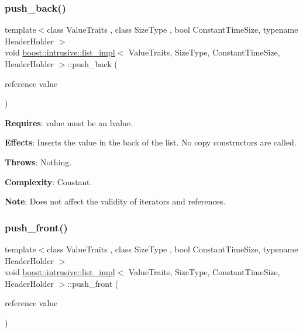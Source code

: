 \subsubsection{\texorpdfstring{push\+\_\+back()}{push\_back()}}
{\footnotesize\ttfamily template$<$class Value\+Traits , class Size\+Type , bool Constant\+Time\+Size, typename Header\+Holder $>$ \\
void \hyperlink{classboost_1_1intrusive_1_1list__impl}{boost\+::intrusive\+::list\+\_\+impl}$<$ Value\+Traits, Size\+Type, Constant\+Time\+Size, Header\+Holder $>$\+::push\+\_\+back (\begin{DoxyParamCaption}\item[{reference}]{value }\end{DoxyParamCaption})\hspace{0.3cm}{\ttfamily [inline]}}

{\bfseries Requires}\+: value must be an lvalue.

{\bfseries Effects}\+: Inserts the value in the back of the list. No copy constructors are called.

{\bfseries Throws}\+: Nothing.

{\bfseries Complexity}\+: Constant.

{\bfseries Note}\+: Does not affect the validity of iterators and references. \mbox{\label{classboost_1_1intrusive_1_1list__impl_ae11db4262630360dd6080aebdbd01ce8}} 
\subsubsection{\texorpdfstring{push\+\_\+front()}{push\_front()}}
{\footnotesize\ttfamily template$<$class Value\+Traits , class Size\+Type , bool Constant\+Time\+Size, typename Header\+Holder $>$ \\
void \hyperlink{classboost_1_1intrusive_1_1list__impl}{boost\+::intrusive\+::list\+\_\+impl}$<$ Value\+Traits, Size\+Type, Constant\+Time\+Size, Header\+Holder $>$\+::push\+\_\+front (\begin{DoxyParamCaption}\item[{reference}]{value }\end{DoxyParamCaption})\hspace{0.3cm}{\ttfamily [inline]}}

